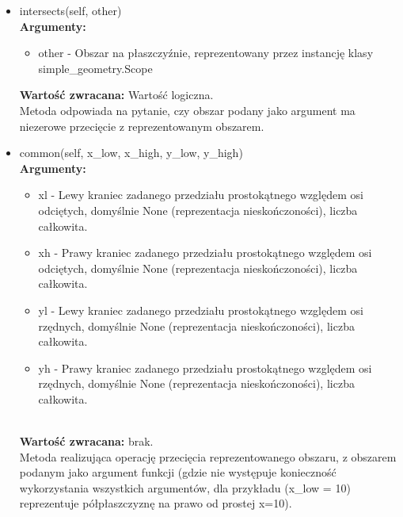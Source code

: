 \documentclass{article}
\begin{document}
\begin{itemize}
                    \item intersects(self, other)\\
                        \textbf{Argumenty:} \begin{itemize}
                                \item other - Obszar na płaszczyźnie, reprezentowany przez instancję klasy simple\_geometry.Scope
                            \end{itemize}
                        \textbf{Wartość zwracana:} Wartość logiczna. \\
                        Metoda odpowiada na pytanie, czy obszar  podany jako argument ma niezerowe przecięcie z reprezentowanym obszarem. 
                    
                    \item common(self, x\_low, x\_high, y\_low, y\_high)\\
                        \textbf{Argumenty:} \begin{itemize}
                            \item xl - Lewy kraniec zadanego przedziału prostokątnego względem osi odciętych, domyślnie None (reprezentacja nieskończoności), liczba całkowita. 
                
                            \item xh - Prawy kraniec zadanego przedziału prostokątnego względem osi odciętych, domyślnie None (reprezentacja nieskończoności), liczba całkowita. 
                
                            \item yl - Lewy kraniec zadanego przedziału prostokątnego względem osi rzędnych, domyślnie None (reprezentacja nieskończoności), liczba całkowita. 
                
                            \item yh - Prawy kraniec zadanego przedziału prostokątnego względem osi rzędnych, domyślnie None (reprezentacja nieskończoności), liczba całkowita.
                        \end{itemize}\\
                        \textbf{Wartość zwracana:} brak.\\
                        Metoda realizująca operację przecięcia reprezentowanego obszaru, z obszarem podanym jako argument funkcji (gdzie nie występuje konieczność wykorzystania wszystkich argumentów, dla przykładu (x\_low = 10) reprezentuje półpłaszczyznę na prawo od prostej x=10). 


\end{itemize}
\end{document}
